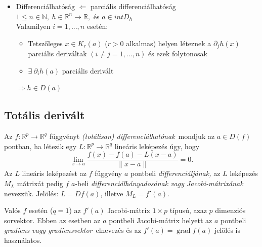 \documentclass[margin=0px]{article}
\newcommand{\R}{\mathbb{R}}
\begin{document}
\begin{description}
\begin{itemize}
            \item Differenciálhatóság $\Leftarrow$ parciális differenciálhatóság \\
                  $ 1 \leq n \in \mathbb{N}, \ h \in \R^n \rightarrow \R, $ és $ a \in intD_h $ \\
                  Valamilyen $i = 1,...,n$ esetén:
                  \begin{itemize}
                      \item Tetszőleges $ x \in K_r(a) $ ($r > 0$ alkalmas) helyen léteznek a $ \partial_jh(x)$ parciális deriváltak $ (i \neq j = 1,...,n)$ és ezek folytonosak
                      \item $\exists \ \partial_ih(a)$ parciális derivált
                  \end{itemize}
                  $\Rightarrow h\in D(a)$
        \end{itemize}
\end{description}
\subsection{Totális derivált}
\rm Az $ f: \R^p \to \R^q $ függvényt {\it (totálisan) differenciálhatónak\,} mondjuk az $a\in D(f)$ pontban,
ha létezik egy $ L: \R^p \to \R^q $ lineáris leképezés úgy, hogy
$$
    \lim_{x\to a}\frac{f(x)-f(a)-L(x-a)}{\|x-a\|}=0.
$$
Az $L$ lineáris leképezést az $f$ függvény $a$ pontbeli {\it differenciáljának,} az $L$ leképezés $M_L$ mátrixát pedig
$f$ $a$-beli {\it differenciálhányadosának vagy Jacobi-mátrixának\,} nevezzük. Jelölés: $L=Df(a)$, illetve $M_L=f'(a)$.

Valós $f$ esetén ($q=1$) az $f'(a)$ Jacobi-mátrix $1\times p$ típusú, azaz $p$ dimenziós sorvektor. Ebben az esetben az $a$
pontbeli Jacobi-mátrix helyett az $a$ pontbeli {\it gradiens {\rm vagy} gradiensvektor\,} elnevezés és az $f'(a)=\operatorname{grad} f(a)$
jelölés is használatos.
\end{document}

